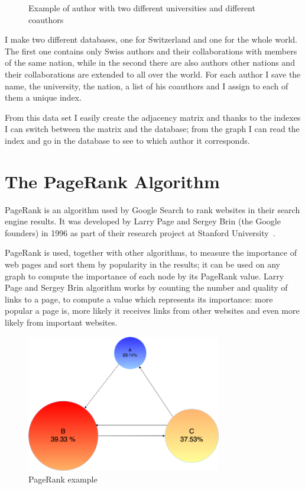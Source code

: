 \documentclass[]{usiinfbachelorproject}
\begin{document}
\begin{figure}
\begin{center}
\begin{tikzpicture}[x=0.75pt,y=0.75pt,yscale=-0.7,xscale=0.7]
\end{tikzpicture}
\caption{Example of author with two different universities and different coauthors} \label{fig:twoUni}
\end{center}
\end{figure}

I make two different databases, one for Switzerland and one for the whole world. The first one contains only Swiss authors and their collaborations with members of the same nation, while in the second there are also authors other nations and their collaborations are extended to all over the world. For each author I save the name, the university, the nation, a list of his coauthors and I assign to each of them a unique index. 

From this data set I easily create the adjacency matrix and thanks to the indexes I can switch between the matrix and the database; from the graph I can read the index and go in the database to see to which author it corresponds.





\section{The PageRank Algorithm} \label{sec:pagerank} 
PageRank is an algorithm used by Google Search to rank websites in their search engine results. It was developed by  Larry Page and  Sergey Brin (the Google founders) in 1996 as part of their research project at Stanford University~\cite{PR}.

PageRank is used, together with other algorithms, to measure the importance of web pages and sort them by popularity in the results; it can be used on any graph to compute the importance of each node by its PageRank value. Larry Page and  Sergey Brin algorithm works by counting the number and quality of links to a page, to compute a value which represents its importance: more popular a page is, more likely it receives links from other websites and even more likely from important websites.

\begin{figure}[ht]
	\centering
	\includegraphics[height=6cm]{img/page_rank_example.png}
	\caption{PageRank example}
	\label{fig:prexample}
\end{figure}
\end{document}
